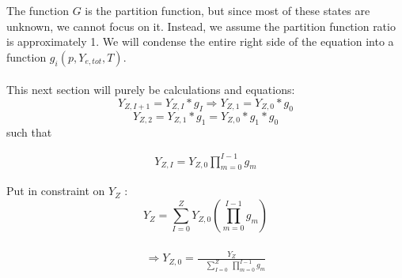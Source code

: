 \documentclass[11pt,a4paper]{article}
\begin{document}
The function $G$ is the partition function, but since most of these states are unknown, we cannot focus on it. Instead, we assume the partition function ratio is approximately 1. We will condense the entire right side of the equation into a function $g_i (p,Y_{e,tot},T) $.
\\\\
This next section will purely be calculations and equations: $$ Y_{Z,I+1} = Y_{Z,I} * g_I \Longrightarrow  Y_{Z,1} = Y_{Z,0}*g_0 $$   $$ Y_{Z,2} = Y_{Z,1}*g_1 = Y_{Z,0}*g_1 * g_0 $$
such that 

\begin{align} 
Y_{Z,I} = Y_{Z,0} \prod_{m=0}^{I - 1} g_m 
\end{align}

Put in constraint on $Y_Z$ : $$ Y_Z = \sum_{I=0}^{Z} Y_{Z,0} \left(\prod_{m=0}^{I - 1} g_m\right) $$\\
\begin{align} 
\Longrightarrow Y_{Z,0} = \frac{Y_Z}{\quad \displaystyle \sum_{I=0}^{Z} \medspace \prod_{m=0}^{I - 1} g_m}
\end{align}
\end{document}
